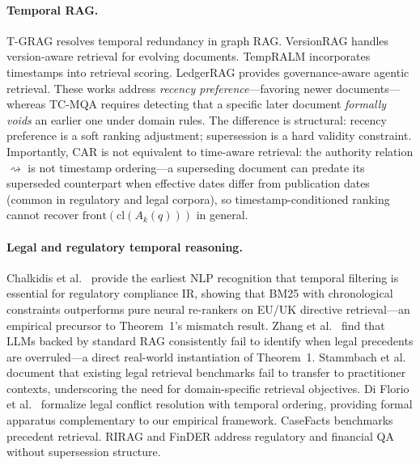\documentclass[11pt]{article}
\begin{document}
\paragraph{Temporal RAG.} T-GRAG \cite{li2025tgrag} resolves temporal redundancy in graph RAG. VersionRAG \cite{huwiler2025versionrag} handles version-aware retrieval for evolving documents. TempRALM \cite{gade2024tempralm} incorporates timestamps into retrieval scoring. LedgerRAG \cite{ledgerrag2025} provides governance-aware agentic retrieval. These works address \emph{recency preference}---favoring newer documents---whereas TC-MQA requires detecting that a specific later document \emph{formally voids} an earlier one under domain rules. The difference is structural: recency preference is a soft ranking adjustment; supersession is a hard validity constraint. Importantly, CAR is not equivalent to time-aware retrieval: the authority relation $\rightsquigarrow$ is not timestamp ordering---a superseding document can predate its superseded counterpart when effective dates differ from publication dates (common in regulatory and legal corpora), so timestamp-conditioned ranking cannot recover $\mathrm{front}(\mathrm{cl}(A_k(q)))$ in general.

\paragraph{Legal and regulatory temporal reasoning.} Chalkidis et al.\ \cite{chalkidis2021regulatory} provide the earliest NLP recognition that temporal filtering is essential for regulatory compliance IR, showing that BM25 with chronological constraints outperforms pure neural re-rankers on EU/UK directive retrieval---an empirical precursor to Theorem~1's mismatch result. Zhang et al.\ \cite{zhang2025precedent} find that LLMs backed by standard RAG consistently fail to identify when legal precedents are overruled---a direct real-world instantiation of Theorem~1. Stammbach et al.\ \cite{stammbach2026defenders} document that existing legal retrieval benchmarks fail to transfer to practitioner contexts, underscoring the need for domain-specific retrieval objectives. Di Florio et al.\ \cite{diflorio2024temporal} formalize legal conflict resolution with temporal ordering, providing formal apparatus complementary to our empirical framework. CaseFacts \cite{putta2026casefacts} benchmarks precedent retrieval. RIRAG \cite{gokhan2024rirag} and FinDER \cite{choi2025finder} address regulatory and financial QA without supersession structure.
\end{document}
